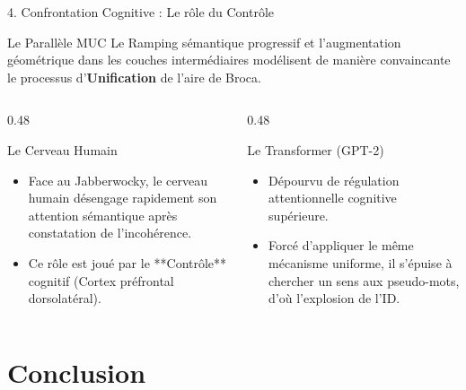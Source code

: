 \documentclass[t, aspectratio=169]{beamer}
\begin{document}
\begin{frame}{4. Confrontation Cognitive : Le rôle du Contrôle}
  \begin{block}{Le Parallèle MUC}
    \small
    Le Ramping sémantique progressif et l'augmentation géométrique dans les couches intermédiaires modélisent de manière convaincante le processus d'\textbf{Unification} de l'aire de Broca.
  \end{block}
  \vspace{0.1cm}
  \begin{columns}[t]
    \begin{column}{0.48\textwidth}
      \begin{block}{Le Cerveau Humain}
        \scriptsize
        \begin{itemize}
          \item Face au Jabberwocky, le cerveau humain désengage rapidement son attention sémantique après constatation de l'incohérence.
          \item Ce rôle est joué par le **Contrôle** cognitif (Cortex préfrontal dorsolatéral).
        \end{itemize}
      \end{block}
    \end{column}
    
    \begin{column}{0.48\textwidth}
      \begin{block}{Le Transformer (GPT-2)}
        \scriptsize
        \begin{itemize}
          \item Dépourvu de régulation attentionnelle cognitive supérieure.
          \item Forcé d'appliquer le même mécanisme uniforme, il s'épuise à chercher un sens aux pseudo-mots, d'où l'explosion de l'ID.
        \end{itemize}
      \end{block}
    \end{column}
  \end{columns}
\end{frame}

\section{Conclusion}
\end{document}
